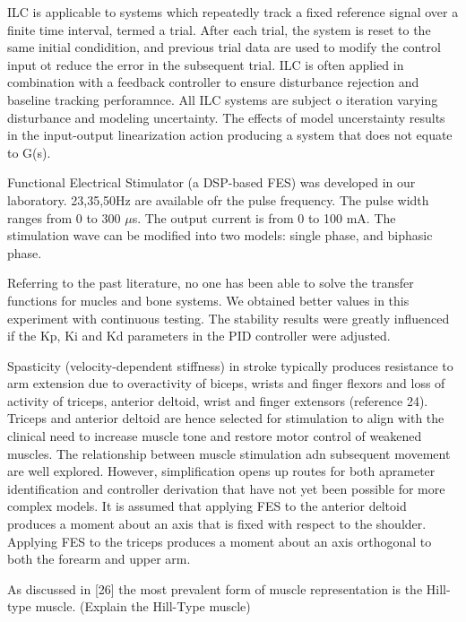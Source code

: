 ILC is applicable to systems which repeatedly track a fixed reference signal over a finite time interval, termed a trial. 
After each trial, the system is reset to the same initial condidition, and previous trial data are used to modify the control input ot reduce the error in the subsequent trial. ILC is often applied in combination with a feedback controller to ensure disturbance rejection and baseline tracking perforamnce. All ILC systems are subject o iteration varying disturbance and modeling uncertainty. The effects of model uncerstainty results in the input-output linearization action producing a system that does not equate to G(s). 

Functional Electrical Stimulator (a DSP-based FES) was developed in our laboratory. 23,35,50Hz are available ofr the pulse frequency. 
The pulse width ranges from 0 to 300 $\mu$s. The output current is from 0 to 100 mA. The stimulation wave can be modified into two models: single phase, and biphasic phase. \cite{NNPID}



Referring to the past literature, no one has been able to solve the transfer functions for mucles and bone systems. We obtained better values in this experiment with continuous testing. The stability results were greatly influenced if the Kp, Ki and Kd parameters in the PID controller were adjusted. \cite{NNPID}

Spasticity (velocity-dependent stiffness) in stroke typically produces resistance to arm extension due to overactivity of biceps, wrists and finger flexors and loss of activity of triceps, anterior deltoid, wrist and finger extensors (reference 24). \cite{IOL}
Triceps and anterior deltoid are hence selected for stimulation to align with the clinical need to increase muscle tone and restore motor control of weakened muscles. 
The relationship between muscle stimulation adn subsequent movement are well explored. However, simplification opens up routes for both aprameter identification and controller derivation that have not yet been possible for more complex models. \cite{IOL}
It is assumed that applying FES to the anterior deltoid produces a moment about an axis that is fixed with respect to the shoulder. Applying FES to the triceps produces a moment about an axis orthogonal to both the forearm and upper arm.\cite{IOL}

As discussed in [26] the most prevalent form of muscle representation is the Hill-type muscle. (Explain the Hill-Type muscle)